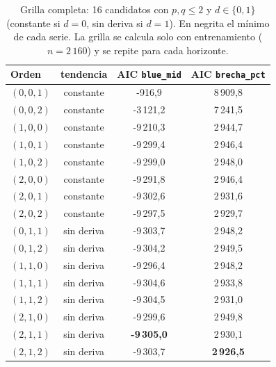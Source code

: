\begin{table}[!ht]
\centering\small
\begin{tabular}{@{}lccc@{}}
\toprule
Orden & tendencia & AIC \texttt{blue\_mid} & AIC \texttt{brecha\_pct} \\
\midrule
$(0,0,1)$ & constante & -916{,}9 & 8\,909{,}8 \\
$(0,0,2)$ & constante & -3\,121{,}2 & 7\,241{,}5 \\
$(1,0,0)$ & constante & -9\,210{,}3 & 2\,944{,}7 \\
$(1,0,1)$ & constante & -9\,299{,}4 & 2\,946{,}4 \\
$(1,0,2)$ & constante & -9\,299{,}0 & 2\,948{,}0 \\
$(2,0,0)$ & constante & -9\,291{,}8 & 2\,946{,}4 \\
$(2,0,1)$ & constante & -9\,302{,}6 & 2\,931{,}6 \\
$(2,0,2)$ & constante & -9\,297{,}5 & 2\,929{,}7 \\
$(0,1,1)$ & sin deriva & -9\,303{,}7 & 2\,948{,}2 \\
$(0,1,2)$ & sin deriva & -9\,304{,}2 & 2\,949{,}5 \\
$(1,1,0)$ & sin deriva & -9\,296{,}4 & 2\,948{,}2 \\
$(1,1,1)$ & sin deriva & -9\,304{,}6 & 2\,933{,}8 \\
$(1,1,2)$ & sin deriva & -9\,304{,}5 & 2\,931{,}0 \\
$(2,1,0)$ & sin deriva & -9\,299{,}6 & 2\,949{,}8 \\
$(2,1,1)$ & sin deriva & \textbf{-9\,305{,}0} & 2\,930{,}1 \\
$(2,1,2)$ & sin deriva & -9\,303{,}7 & \textbf{2\,926{,}5} \\
\bottomrule
\end{tabular}
\caption{Grilla completa: 16 candidatos con $p,q \le 2$ y $d \in \{0,1\}$
(constante si $d=0$, sin deriva si $d=1$). En negrita el mínimo de cada serie.
La grilla se calcula solo con entrenamiento ($n = 2\,160$) y se repite para cada
horizonte.}
\label{tab:arima_grid}
\end{table}

